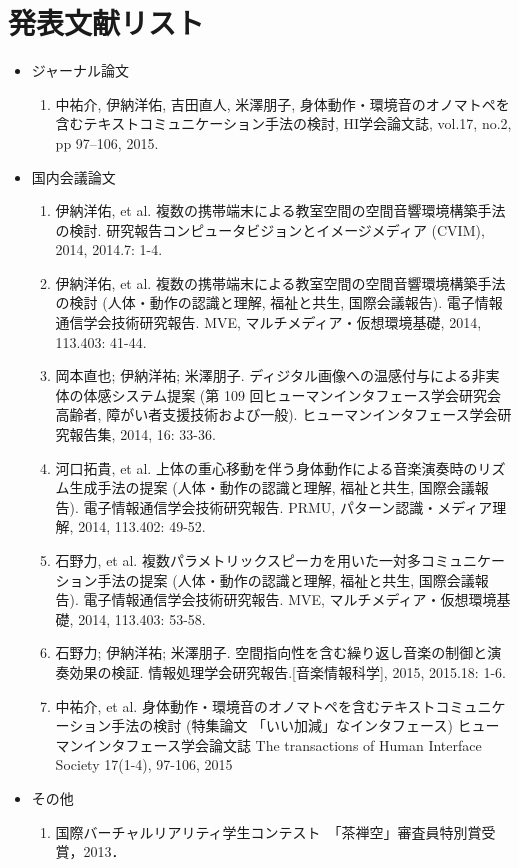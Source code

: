 \chapter*{発表文献リスト}

\begin{itemize}

  \item[] ジャーナル論文
  \begin{enumerate}
    \item 中祐介, 伊納洋佑, 吉田直人, 米澤朋子, 身体動作・環境音のオノマトペを含むテキストコミュニケーション手法の検討, HI学会論文誌, vol.17, no.2, pp 97--106, 2015.
  \end{enumerate}

\begin{comment}
  \item[] 国際会議論文
  \begin{enumerate}
    \item hoge
  \end{enumerate}
\end{comment}


  \item[] 国内会議論文
  \begin{enumerate}
    \item 伊納洋佑, et al. 複数の携帯端末による教室空間の空間音響環境構築手法の検討. 研究報告コンピュータビジョンとイメージメディア (CVIM), 2014, 2014.7: 1-4.
    \item 伊納洋佑, et al. 複数の携帯端末による教室空間の空間音響環境構築手法の検討 (人体・動作の認識と理解, 福祉と共生, 国際会議報告). 電子情報通信学会技術研究報告. MVE, マルチメディア・仮想環境基礎, 2014, 113.403: 41-44.
    \item 岡本直也; 伊納洋祐; 米澤朋子. ディジタル画像への温感付与による非実体の体感システム提案 (第 109 回ヒューマンインタフェース学会研究会 高齢者, 障がい者支援技術および一般). ヒューマンインタフェース学会研究報告集, 2014, 16: 33-36.
    \item 河口拓貴, et al. 上体の重心移動を伴う身体動作による音楽演奏時のリズム生成手法の提案 (人体・動作の認識と理解, 福祉と共生, 国際会議報告). 電子情報通信学会技術研究報告. PRMU, パターン認識・メディア理解, 2014, 113.402: 49-52.
    \item 石野力, et al. 複数パラメトリックスピーカを用いた一対多コミュニケーション手法の提案 (人体・動作の認識と理解, 福祉と共生, 国際会議報告). 電子情報通信学会技術研究報告. MVE, マルチメディア・仮想環境基礎, 2014, 113.403: 53-58.
    \item 石野力; 伊納洋祐; 米澤朋子. 空間指向性を含む繰り返し音楽の制御と演奏効果の検証. 情報処理学会研究報告.[音楽情報科学], 2015, 2015.18: 1-6.
    \item 中祐介, et al. 身体動作・環境音のオノマトペを含むテキストコミュニケーション手法の検討 (特集論文 「いい加減」なインタフェース) ヒューマンインタフェース学会論文誌 The transactions of Human Interface Society 17(1-4), 97-106, 2015
  \end{enumerate}

  \item[] その他
  \begin{enumerate}
    \item 国際バーチャルリアリティ学生コンテスト　「茶禅空」審査員特別賞受賞，2013．
  \end{enumerate}

\end{itemize}
